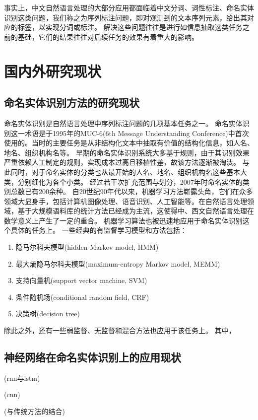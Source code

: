 事实上，中文自然语言处理的大部分应用都面临着中文分词、词性标注、命名实体识别这类问题，我们称之为序列标注问题，即对观测到的文本序列元素，给出其对应的标签，以实现分词或标注。
解决这些问题往往是进行如信息抽取这类任务之前的基础，它们的结果往往对后续任务的效果有着重大的影响。

\section{国内外研究现状}
\label{sec:current}
\subsection{命名实体识别方法的研究现状}
命名实体识别是自然语言处理中序列标注问题的几项基本任务之一。
命名实体识别这一术语是于1995年的MUC-6(6th Message Understanding Conference)中首次使用的。当时的主要任务是从非结构化文本中抽取有价值的结构化信息，如人名、地名、组织机构名等。
早期的命名实体识别系统大多基于规则，由于其识别效果严重依赖人工制定的规则，实现成本过高且移植性差，故该方法逐渐被淘汰。
与此同时，对于命名实体的分类也从最开始的人名、地名、组织机构名这些基本大类，分别细化为各个小类。
经过若干次扩充范围与划分，2007年时命名实体的类别总数已有200余种。
自20世纪90年代以来，机器学习方法崭露头角，它们在众多领域大显身手，包括计算机图像处理、语音识别、人工智能等。在自然语言处理领域，基于大规模语料库的统计方法已经成为主流，这使得中、西文自然语言处理在数学意义上产生了一定的重合。
机器学习算法也被迅速地应用于命名实体识别这个具体的任务上。
一些经典的有监督学习模型和方法包括：
\begin{enumerate}
    \item 隐马尔科夫模型(hidden Markov model, HMM)
    \item 最大熵隐马尔科夫模型(maximum-entropy Markov model, MEMM)
    \item 支持向量机(support vector machine, SVM)
    \item 条件随机场(conditional random field, CRF)
    \item 决策树(decision tree)
\end{enumerate}
除此之外，还有一些弱监督、无监督和混合方法也应用于该任务上。
其中，

\subsection{神经网络在命名实体识别上的应用现状}


(rnn与lstm)

(cnn)

(与传统方法的结合)


